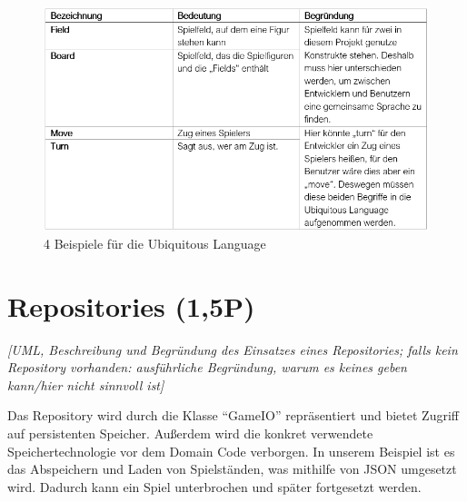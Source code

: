 \begin{figure}[htbp]
\centering
\centerline{\includegraphics[scale=.7]{ubiquitous}}
\caption{4 Beispiele für die Ubiquitous Language}
\label{fig:ubiquitous}
\end{figure}



\section{Repositories (1,5P)}
\emph{[UML, Beschreibung und Begründung des Einsatzes eines Repositories; falls kein Repository
vorhanden: ausführliche Begründung, warum es keines geben kann/hier nicht sinnvoll ist]}

\noindent Das Repository wird durch die Klasse \enquote{GameIO} repräsentiert und bietet Zugriff auf persistenten Speicher. Außerdem wird die konkret verwendete Speichertechnologie vor dem Domain Code verborgen. In unserem Beispiel ist es das Abspeichern und Laden von Spielständen, was mithilfe von JSON umgesetzt wird. Dadurch kann ein Spiel unterbrochen und später fortgesetzt werden.

